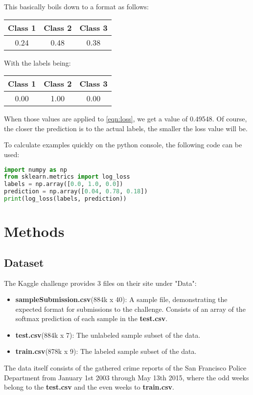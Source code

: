 \documentclass[titlepage,12pt]{article}
\begin{document}
This basically boils down to a format as follows:

\begin{center}
\begin{tabular}{c|c|c}
Class 1 & Class 2 & Class 3\\\hline
0.24 & 0.48 & 0.38
\end{tabular}
\end{center}

With the labels being:

\begin{center}
\begin{tabular}{c|c|c}
Class 1 & Class 2 & Class 3\\\hline
0.00 & 1.00 & 0.00
\end{tabular}
\end{center}

When those values are applied to \ref{eqn:loss}, we get a value of 0.49548. Of course, the closer the prediction is to the actual labels, the smaller the loss value will be.

To calculate examples quickly on the python console, the following code can be used:
\begin{lstlisting}[language=python,otherkeywords={as},label=lst:loglosscalculation,caption={Quick Log Loss Calculation}]
import numpy as np
from sklearn.metrics import log_loss
labels = np.array([0.0, 1.0, 0.0])
prediction = np.array([0.04, 0.78, 0.18])
print(log_loss(labels, prediction))
\end{lstlisting}


\pagebreak
\section{Methods}\label{s:methods}
\subsection{Dataset}\label{ss:dataset}
The Kaggle challenge \citep{kgl_sf_crime} provides 3 files on their site under "Data":
\begin{itemize}
\item \textbf{sampleSubmission.csv}(884k x 40): A sample file, demonstrating the expected format for submissions to the challenge. Consists of an array of the softmax prediction of each sample in the \textbf{test.csv}.
\item \textbf{test.csv}(884k x 7): The unlabeled sample subset of the data.
\item \textbf{train.csv}(878k x 9): The labeled sample subset of the data.
\end{itemize}
The data itself consists of the gathered crime reports of the San Francisco Police Department from January 1st 2003 through May 13th 2015, where the odd weeks belong to the \textbf{test.csv} and the even weeks to \textbf{train.csv}.
\end{document}

